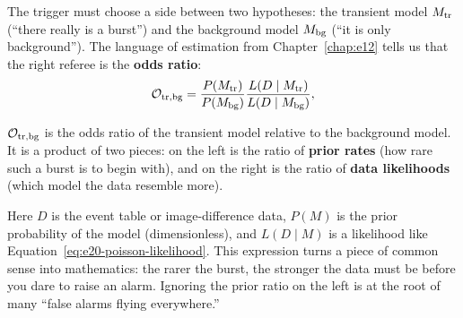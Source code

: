 The trigger must choose a side between two hypotheses: the transient model \(M_{\rm tr}\) (``there really is a burst'') and the background model \(M_{\rm bg}\) (``it is only background''). The language of estimation from Chapter~\ref{chap:e12} tells us that the right referee is the \textbf{odds ratio}:
\begin{equation}
  {\cal O}_{\rm tr,bg}
  =
  \frac{P(M_{\rm tr})}{P(M_{\rm bg})}
  \frac{L(D\mid M_{\rm tr})}{L(D\mid M_{\rm bg})},
  \label{eq:e20-trigger-odds}
\end{equation}
\begin{formulaexplain}
\({\cal O}_{\rm tr,bg}\) is the odds ratio of the transient model relative to the background model. It is a product of two pieces: on the left is the ratio of \textbf{prior rates} (how rare such a burst is to begin with), and on the right is the ratio of \textbf{data likelihoods} (which model the data resemble more).
\end{formulaexplain}
Here \(D\) is the event table or image-difference data, \(P(M)\) is the prior probability of the model (dimensionless), and \(L(D\mid M)\) is a likelihood like Equation~\eqref{eq:e20-poisson-likelihood}. This expression turns a piece of common sense into mathematics: the rarer the burst, the stronger the data must be before you dare to raise an alarm. Ignoring the prior ratio on the left is at the root of many ``false alarms flying everywhere.''

